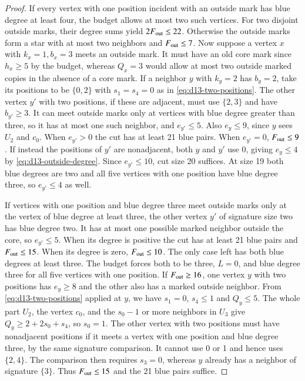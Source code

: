 \documentclass[preprint,11pt,numbers]{elsarticle-arxiv}
\numberwithin{equation}{section}
\theoremstyle{definition}
\begin{document}
\begin{proof}
If every vertex with one position incident with an outside mark has
blue degree at least four, the budget allows at most two such vertices.
For two disjoint outside marks, their degree sums yield
$2F_{\rm out}\le22$. Otherwise the outside marks form a star with
at most two neighbors and $F_{\rm out}\le7$. Now suppose a vertex
$x$ with $k_x=1,b_x=3$ meets an outside mark. It must have an old
core mark since $h_x\ge5$ by the budget, whereas $Q_x=3$ would
allow at most two outside marked copies in the absence of a core mark.
If a neighbor $y$ with $k_y=2$ has $b_y=2$, take its positions to
be $\{0,2\}$ with $s_1=s_4=0$ as in \eqref{eq:d13-two-positions}.
The other vertex $y'$ with two positions, if these are adjacent, must
use $\{2,3\}$ and have $b_{y'}\ge3$. It can meet outside marks only
at vertices with blue degree greater than three, so it has at most
one such neighbor, and $e_{y'}\le5$. Also $e_y\le9$, since $y$
sees $U_2$ and $c_0$. When $e_{y'}>0$ the cut has at least 21
blue pairs. When $e_{y'}=0$, $F_{\rm out}\le9$. If instead the positions
of $y'$ are nonadjacent, both $y$ and $y'$ use 0, giving $e_y\le4$
by \eqref{eq:d13-outside-degree}. Since $e_{y'}\le10$, cut size
20 suffices. At size 19 both blue degrees are two and all five vertices
with one position have blue degree three, so $e_{y'}\le4$ as well.

If vertices with one position and blue degree three meet outside marks
only at the vertex of blue degree at least three, the other vertex $y'$
of signature size two has blue degree two. It has at most one possible
marked neighbor outside the core, so $e_{y'}\le5$. When its degree is positive the cut has at least 21 blue
pairs and $F_{\rm out}\le15$. When its degree is zero, $F_{\rm out}\le10$.
The only case left has both blue degrees at least three. The budget
forces both to be three, $L=0$, and blue degree three for all five
vertices with one position. If $F_{\rm out}\ge16$, one vertex $y$
with two positions has $e_y\ge8$ and the other also has a marked
outside neighbor. From \eqref{eq:d13-two-positions} applied at $y$,
we have $s_1=0$, $s_4\le1$ and $Q_y\le5$. The whole part $U_2$,
the vertex $c_0$, and the $s_0-1$ or more neighbors in $U_3$ give
$Q_y\ge2+2s_0+s_4$, so $s_0=1$. The other vertex with two positions
must have nonadjacent positions if it meets a vertex with one
position and blue degree three, by the same signature comparison.
It cannot use 0 or 1 and hence uses $\{2,4\}$. The comparison then
requires $s_3=0$, whereas $y$ already has a neighbor of signature
$\{3\}$. Thus $F_{\rm out}\le15$ and the 21 blue pairs suffice.


\end{proof}
\end{document}
